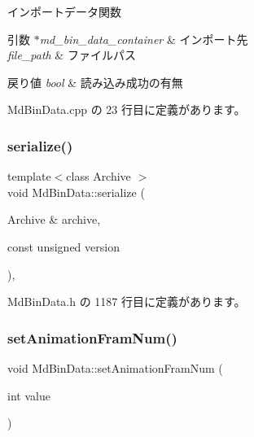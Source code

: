 インポートデータ関数 


\begin{DoxyParams}{引数}
{\em $\ast$md\+\_\+bin\+\_\+data\+\_\+container} & インポート先 \\
\hline
{\em file\+\_\+path} & ファイルパス \\
\hline
\end{DoxyParams}

\begin{DoxyRetVals}{戻り値}
{\em bool} & 読み込み成功の有無 \\
\hline
\end{DoxyRetVals}


 Md\+Bin\+Data.\+cpp の 23 行目に定義があります。

\mbox{\label{class_md_bin_data_a3311ed96bf9545d30a9b08c6649078a9}} 
\subsubsection{\texorpdfstring{serialize()}{serialize()}}
{\footnotesize\ttfamily template$<$class Archive $>$ \\
void Md\+Bin\+Data\+::serialize (\begin{DoxyParamCaption}\item[{Archive \&}]{archive,  }\item[{const unsigned}]{version }\end{DoxyParamCaption})\hspace{0.3cm}{\ttfamily [inline]}, {\ttfamily [private]}}



 Md\+Bin\+Data.\+h の 1187 行目に定義があります。

\mbox{\label{class_md_bin_data_a656893994f5197194cae842918090f59}} 
\subsubsection{\texorpdfstring{set\+Animation\+Fram\+Num()}{setAnimationFramNum()}}
{\footnotesize\ttfamily void Md\+Bin\+Data\+::set\+Animation\+Fram\+Num (\begin{DoxyParamCaption}\item[{int}]{value }\end{DoxyParamCaption})}



